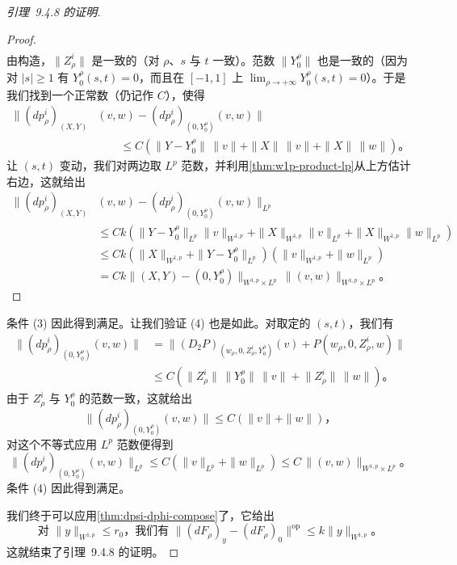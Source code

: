 \begin{proof}[引理~9.4.8 的证明]
\begin{itemize}
\begin{proof}
\[\begin{aligned}
\end{aligned}
\]
由构造，$\bigl\|Z_{\rho}^{i}\bigr\|$ 是一致\trBounded{}的（对 $\rho$、$s$ 与 $t$ 一致）。范数 $\bigl\|Y_{0}^{\rho}\bigr\|$ 也是一致\trBounded{}的（因为对 $|s|\ge1$ 有 $Y_{0}^{\rho}(s,t)=0$，而且在 $[-1,1]$ 上 $\lim_{\rho\to+\infty}Y_{0}^{\rho}(s,t)=0$）。于是我们找到一个正常数（仍记作 $C$），使得
\[
\begin{aligned}
\bigl\|(dp_{\rho}^{i})_{(X,Y)}&(v,w)-(dp_{\rho}^{i})_{(0,Y_{0}^{\rho})}(v,w)\bigr\|\\
&\qquad\le C\left(\|Y-Y_{0}^{\rho}\|\,\|v\|+\|X\|\,\|v\|+\|X\|\,\|w\|\right)\text{。}
\end{aligned}
\]
让 $(s,t)$ 变动，我们对两边取 $L^{p}$ 范数，并利用\cref{thm:w1p-product-lp}从上方估计右边，这就给出
\[
\begin{aligned}
\bigl\|(dp_{\rho}^{i})_{(X,Y)}&(v,w)-(dp_{\rho}^{i})_{(0,Y_{0}^{\rho})}(v,w)\bigr\|_{L^{p}}\\
&\le Ck\left(\|Y-Y_{0}^{\rho}\|_{L^{p}}\|v\|_{W^{1,p}}+\|X\|_{W^{1,p}}\|v\|_{L^{p}}+\|X\|_{W^{1,p}}\|w\|_{L^{p}}\right)\\
&\le Ck\left(\|X\|_{W^{1,p}}+\|Y-Y_{0}^{\rho}\|_{L^{p}}\right)\left(\|v\|_{W^{1,p}}+\|w\|_{L^{p}}\right)\\
&=Ck\bigl\|(X,Y)-(0,Y_{0}^{\rho})\bigr\|_{W^{1,p}\times L^{p}}\,\bigl\|(v,w)\bigr\|_{W^{1,p}\times L^{p}}\text{。}
\end{aligned}
\]
\end{proof}

条件 (3) 因此得到满足。让我们验证 (4) 也是如此。对取定的 $(s,t)$，我们有
\[
\begin{aligned}
\bigl\|(dp_{\rho}^{i})_{(0,Y_{0}^{\rho})}(v,w)\bigr\|&=\bigl\|(D_{2}P)_{(w_{\rho},0,Z_{\rho}^{i},Y_{0}^{\rho})}(v)+P(w_{\rho},0,Z_{\rho}^{i},w)\bigr\|\\
&\le C\left(\bigl\|Z_{\rho}^{i}\bigr\|\,\bigl\|Y_{0}^{\rho}\bigr\|\,\|v\|+\bigl\|Z_{\rho}^{i}\bigr\|\,\|w\|\right)\text{。}
\end{aligned}
\]
由于 $Z_{\rho}^{i}$ 与 $Y_{0}^{\rho}$ 的范数一致\trBounded{}，这就给出
\[
\bigl\|(dp_{\rho}^{i})_{(0,Y_{0}^{\rho})}(v,w)\bigr\|\le C\left(\|v\|+\|w\|\right)\text{，}
\]
对这个不等式应用 $L^{p}$ 范数便得到
\[
\bigl\|(dp_{\rho}^{i})_{(0,Y_{0}^{\rho})}(v,w)\bigr\|_{L^{p}}\le C\left(\|v\|_{L^{p}}+\|w\|_{L^{p}}\right)\le C\,\bigl\|(v,w)\bigr\|_{W^{1,p}\times L^{p}}\text{。}
\]
条件 (4) 因此得到满足。
\end{itemize}

我们终于可以应用\cref{thm:dpsi-dphi-compose}了，它给出
\[
\text{对 }\|y\|_{W^{1,p}}\le r_{0}\text{，我们有 }\bigl\|(dF_{\rho})_{y}-(dF_{\rho})_{0}\bigr\|^{\mathrm{op}}\le k\|y\|_{W^{1,p}}\text{。}
\]
这就结束了引理~9.4.8 的证明。
\end{proof}


